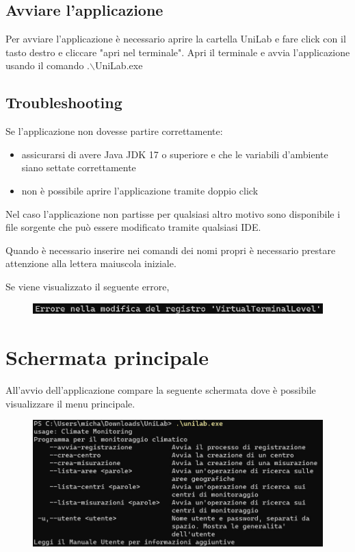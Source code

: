 \documentclass[12pt]{scrreprt}
\begin{document}
		\subsection{Avviare l'applicazione}
		
		Per avviare l'applicazione è necessario aprire la cartella UniLab e fare click con il tasto destro e cliccare "apri nel terminale".
		Apri il terminale e avvia l'applicazione usando il comando .$\backslash$UniLab.exe
		

		\subsection{Troubleshooting}
		
		Se l'applicazione non dovesse partire correttamente:
		\begin{itemize}
			\item assicurarsi di avere Java JDK 17 o superiore e che le variabili d'ambiente siano settate correttamente
			\item non è possibile aprire l'applicazione tramite doppio click
		\end{itemize}
		
		Nel caso l'applicazione non partisse per qualsiasi altro motivo sono disponibile i file sorgente che può essere modificato tramite qualsiasi IDE.
		
		Quando è necessario inserire nei comandi dei nomi propri è necessario prestare attenzione alla lettera maiuscola iniziale.
		
		Se viene visualizzato il seguente errore,
		\begin{figure}[H]
			\centering
			\includegraphics[width=0.8\linewidth]{Screen/erroremodificaregistro}
			\caption[Schermata principale]{}
			\label{fig:erroremodififcaregistro}
		\end{figure}
		
		
		
	\section{Schermata principale}

	
	All'avvio dell'applicazione compare la seguente schermata dove è possibile visualizzare il menu principale.
	
	\begin{figure}[H]
		\centering
		\includegraphics[width=0.9\linewidth]{Screen/schermataprincipale}
		\caption[Schermata principale]{}
		\label{fig:schermataprincipale}
	\end{figure}
	
\end{document}
